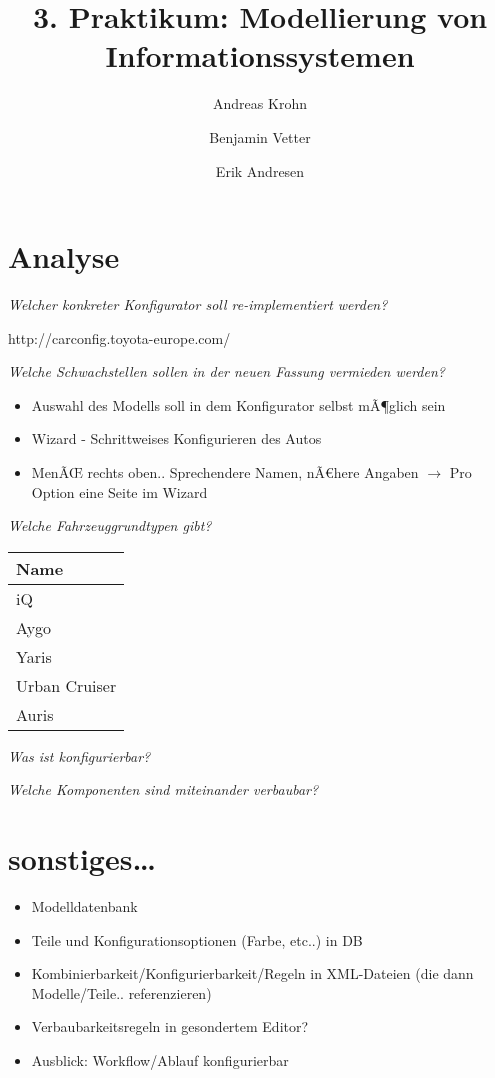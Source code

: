 \documentclass[a4paper,10pt]{article}
\title{3. Praktikum: Modellierung von Informationssystemen}
\author{Andreas Krohn \and Benjamin Vetter \and Erik Andresen}
\begin{document}
\maketitle

\tableofcontents

\section{Analyse}
\emph{Welcher konkreter Konfigurator soll re-implementiert werden?}

http://carconfig.toyota-europe.com/

\emph{Welche Schwachstellen sollen in der neuen Fassung vermieden werden?}

\begin{itemize}
 \item Auswahl des Modells soll in dem Konfigurator selbst mÃ¶glich sein
 \item Wizard - Schrittweises Konfigurieren des Autos
 \item MenÃŒ rechts oben.. Sprechendere Namen, nÃ€here Angaben $\rightarrow$ Pro Option eine Seite im Wizard
\end{itemize}

\emph{Welche Fahrzeuggrundtypen gibt?}

\begin{tabular}{|l|}
\hline
Name \\
\hline
iQ \\
Aygo \\
Yaris \\
Urban Cruiser \\
Auris\\
\hline
\end{tabular}

\emph{Was ist konfigurierbar?}

\emph{Welche Komponenten sind miteinander verbaubar?}



\section{sonstiges\ldots}
\begin{itemize}
 \item Modelldatenbank
 \item Teile und Konfigurationsoptionen (Farbe, etc..) in DB
 \item Kombinierbarkeit/Konfigurierbarkeit/Regeln in XML-Dateien (die dann Modelle/Teile.. referenzieren)
 \item Verbaubarkeitsregeln in gesondertem Editor?
 \item Ausblick: Workflow/Ablauf konfigurierbar
\end{itemize}
\end{document}
